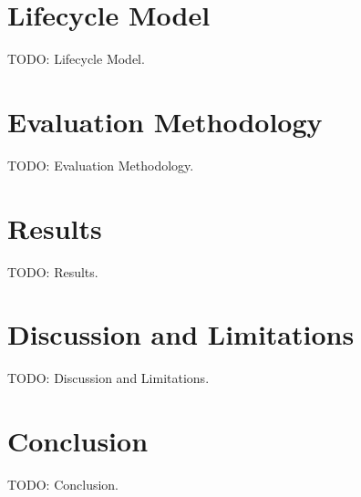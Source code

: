 \documentclass[11pt]{article}
\begin{document}
\section{Lifecycle Model}
TODO: Lifecycle Model.

\section{Evaluation Methodology}
TODO: Evaluation Methodology.

\section{Results}
TODO: Results.

\section{Discussion and Limitations}
TODO: Discussion and Limitations.

\section{Conclusion}
TODO: Conclusion.


\end{document}
